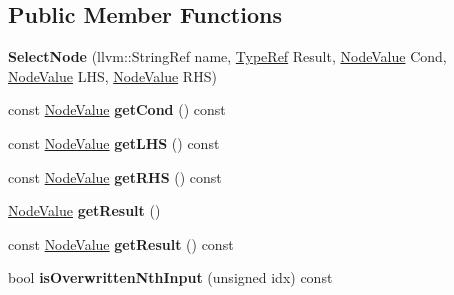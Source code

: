 \subsection*{Public Member Functions}
\begin{DoxyCompactItemize}
\item 
\mbox{\label{classglow_1_1_select_node_a4374f9d560986030f3ec899b67c81626}} 
{\bfseries Select\+Node} (llvm\+::\+String\+Ref name, \hyperlink{structglow_1_1_type}{Type\+Ref} Result, \hyperlink{structglow_1_1_node_value}{Node\+Value} Cond, \hyperlink{structglow_1_1_node_value}{Node\+Value} L\+HS, \hyperlink{structglow_1_1_node_value}{Node\+Value} R\+HS)
\item 
\mbox{\label{classglow_1_1_select_node_a2b1e0dc31e7850c87d1366c502c8ae23}} 
const \hyperlink{structglow_1_1_node_value}{Node\+Value} {\bfseries get\+Cond} () const
\item 
\mbox{\label{classglow_1_1_select_node_afe1f44cdb9cd3807e341c1a315e42011}} 
const \hyperlink{structglow_1_1_node_value}{Node\+Value} {\bfseries get\+L\+HS} () const
\item 
\mbox{\label{classglow_1_1_select_node_af53f3b13b88f7bbe3a09292adaf54a81}} 
const \hyperlink{structglow_1_1_node_value}{Node\+Value} {\bfseries get\+R\+HS} () const
\item 
\mbox{\label{classglow_1_1_select_node_a05345144ed26b6f323abdfc140852047}} 
\hyperlink{structglow_1_1_node_value}{Node\+Value} {\bfseries get\+Result} ()
\item 
\mbox{\label{classglow_1_1_select_node_ab044ab76882a66191c0554a9018ec3f1}} 
const \hyperlink{structglow_1_1_node_value}{Node\+Value} {\bfseries get\+Result} () const
\item 
\mbox{\label{classglow_1_1_select_node_a6793c8537b64e49c7266b53eeaef4855}} 
bool {\bfseries is\+Overwritten\+Nth\+Input} (unsigned idx) const
\item 
\mbox{\label{classglow_1_1_select_node_a58c84c6bf89eeaf8a37e3fee1db13c47}} 

\end{DoxyCompactItemize}
